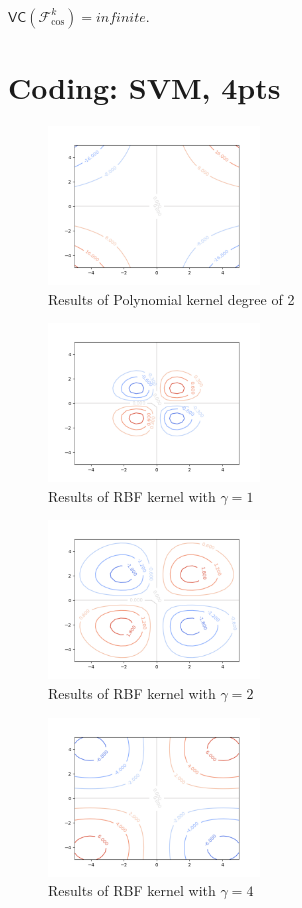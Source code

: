 \documentclass[12pt]{article}
\begin{document}
\subsubsection{}
$\mathsf{V} \mathsf{C} (\mathcal{F}^{k} _{\text{cos}}) = infinite$. 


\section{Coding: SVM, 4pts}
\begin{figure}[h]
    \centering
    \includegraphics[width=0.5\textwidth]{imgs/poly_2.png}
    \caption{Results of Polynomial kernel degree of 2}
    \end{figure}

    \begin{figure}[h]
        \centering
        \includegraphics[width=0.5\textwidth]{imgs/rbf_1.png}
        \caption{Results of RBF kernel with $\gamma = 1$}
    \end{figure}
    
    \begin{figure}[h]
        \centering
        \includegraphics[width=0.5\textwidth]{imgs/rbf_2.png}
        \caption{Results of RBF kernel with $\gamma = 2$}
    \end{figure}

    \begin{figure}[h]
        \centering
        \includegraphics[width=0.5\textwidth]{imgs/rbf_4.png}
        \caption{Results of RBF kernel with $\gamma = 4$}
    \end{figure}
    
\end{document}
